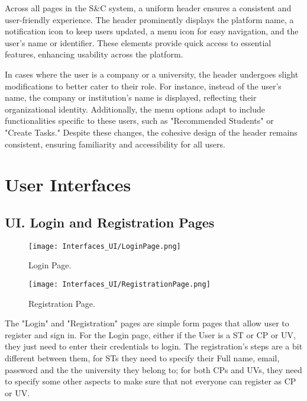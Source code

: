 Across all pages in the S\&C system, a uniform header ensures a consistent and user-friendly experience. The header prominently displays the platform name, a notification icon to keep users updated, a menu icon for easy navigation, and the user’s name or identifier. These elements provide quick access to essential features, enhancing usability across the platform.

In cases where the user is a company or a university, the header undergoes slight modifications to better cater to their role. For instance, instead of the user's name, the company or institution’s name is displayed, reflecting their organizational identity. Additionally, the menu options adapt to include functionalities specific to these users, such as "Recommended Students" or "Create Tasks." Despite these changes, the cohesive design of the header remains consistent, ensuring familiarity and accessibility for all users.
 

\newpage

\section{User Interfaces}
\setcounter{ui}{1}
\newcommand{\cui}{\theui{}}

\subsection*{UI\cui . Login and Registration Pages}

\begin{figure}[H]
    \begin{center}
        \texttt{[image: Interfaces\_UI/LoginPage.png]}
        \caption{Login Page.}
        \label{fig:login_page}%
    \end{center}

    \begin{center}
        \texttt{[image: Interfaces\_UI/RegistrationPage.png]}
        \caption{Registration Page.}
        \label{fig:registration_page}%
    \end{center}
\end{figure}

The "Login" and "Registration" pages are simple form pages that allow user to register and sign in.  For the Login page, either if the User is a ST or CP or UV, they just need to enter their credentials to login. The registration's steps are a bit different between them, for STs they need to specify their Full name, email, password and the the university they belong to; for both CPs and UVs, they need to specify some other aspects to make sure that not everyone can register as CP or UV.


